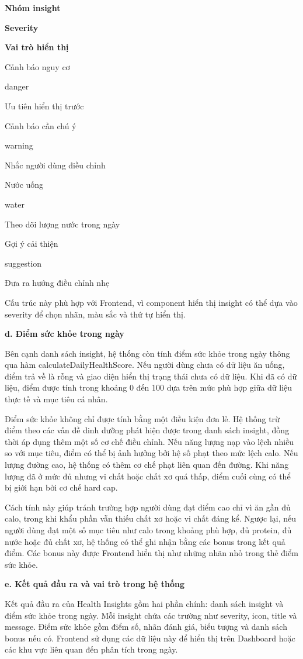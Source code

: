 \textbf{Nhóm insight}

\textbf{Severity}

\textbf{Vai trò hiển thị}

Cảnh báo nguy cơ

danger

Ưu tiên hiển thị trước

Cảnh báo cần chú ý

warning

Nhắc người dùng điều chỉnh

Nước uống

water

Theo dõi lượng nước trong ngày

Gợi ý cải thiện

suggestion

Đưa ra hướng điều chỉnh nhẹ

Cấu trúc này phù hợp với Frontend, vì component hiển thị insight có thể dựa vào severity để chọn nhãn, màu sắc và thứ tự hiển thị.

\textbf{d. Điểm sức khỏe trong ngày}

Bên cạnh danh sách insight, hệ thống còn tính điểm sức khỏe trong ngày thông qua hàm calculateDailyHealthScore. Nếu người dùng chưa có dữ liệu ăn uống, điểm trả về là rỗng và giao diện hiển thị trạng thái chưa có dữ liệu. Khi đã có dữ liệu, điểm được tính trong khoảng 0 đến 100 dựa trên mức phù hợp giữa dữ liệu thực tế và mục tiêu cá nhân.

Điểm sức khỏe không chỉ được tính bằng một điều kiện đơn lẻ. Hệ thống trừ điểm theo các vấn đề dinh dưỡng phát hiện được trong danh sách insight, đồng thời áp dụng thêm một số cơ chế điều chỉnh. Nếu năng lượng nạp vào lệch nhiều so với mục tiêu, điểm có thể bị ảnh hưởng bởi hệ số phạt theo mức lệch calo. Nếu lượng đường cao, hệ thống có thêm cơ chế phạt liên quan đến đường. Khi năng lượng đã ở mức đủ nhưng vi chất hoặc chất xơ quá thấp, điểm cuối cùng có thể bị giới hạn bởi cơ chế hard cap.

Cách tính này giúp tránh trường hợp người dùng đạt điểm cao chỉ vì ăn gần đủ calo, trong khi khẩu phần vẫn thiếu chất xơ hoặc vi chất đáng kể. Ngược lại, nếu người dùng đạt một số mục tiêu như calo trong khoảng phù hợp, đủ protein, đủ nước hoặc đủ chất xơ, hệ thống có thể ghi nhận bằng các bonus trong kết quả điểm. Các bonus này được Frontend hiển thị như những nhãn nhỏ trong thẻ điểm sức khỏe.

\textbf{e. Kết quả đầu ra và vai trò trong hệ thống}

Kết quả đầu ra của Health Insights gồm hai phần chính: danh sách insight và điểm sức khỏe trong ngày. Mỗi insight chứa các trường như severity, icon, title và message. Điểm sức khỏe gồm điểm số, nhãn đánh giá, biểu tượng và danh sách bonus nếu có. Frontend sử dụng các dữ liệu này để hiển thị trên Dashboard hoặc các khu vực liên quan đến phân tích trong ngày.

